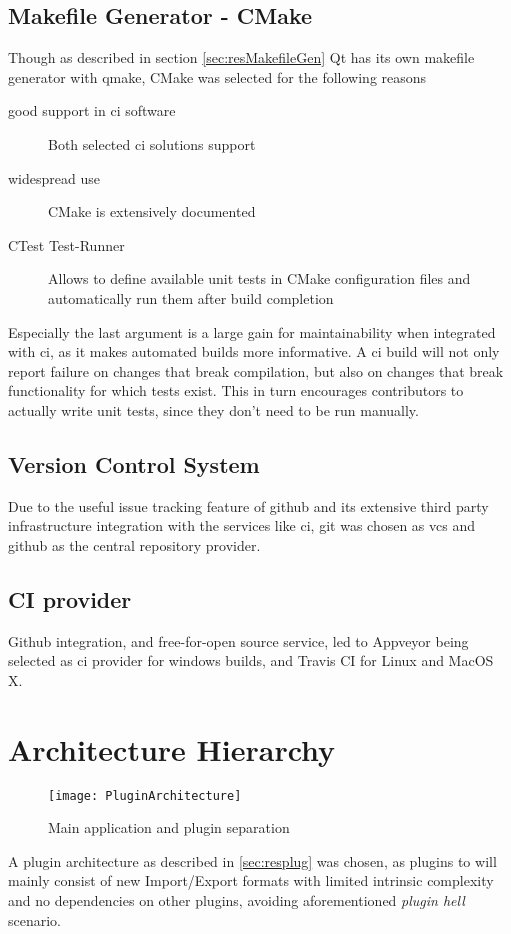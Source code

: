 \begin{figure}[h]
\end{figure}

\subsection{Makefile Generator - CMake}
Though as described in section \ref{sec:resMakefileGen} Qt has its own makefile generator with qmake, CMake was selected for the following reasons
\begin{description}
	\item[good support in \gls{ci} software] Both selected \gls{ci} solutions support 
	\item[widespread use] CMake is extensively documented 
	\item[CTest Test-Runner] Allows to define available unit tests in CMake configuration files and automatically run them after build completion 
\end{description}

Especially the last argument is a large gain for maintainability when integrated with \gls{ci}, as it makes automated builds more informative.
A \gls{ci} build will not only report failure on changes that break compilation, but also on changes that break functionality for which tests exist. This in turn encourages contributors to actually write unit tests, since they don't need to be run manually.


\subsection{Version Control System}
Due to the useful issue tracking feature of github and its extensive third party infrastructure integration with the services like \gls{ci}, git was chosen as \gls{vcs} and github as the central repository provider.

\subsection{CI provider}
Github integration, and free-for-open source service, led to Appveyor being selected as \gls{ci} provider for windows builds, and Travis CI for Linux and MacOS X.

\section{Architecture Hierarchy}
\begin{figure}
	\texttt{[image: PluginArchitecture]}
	\caption{Main application and plugin separation}
	\label{fig:comp}
\end{figure}
A plugin architecture as described in \ref{sec:resplug} was chosen, as plugins to  will mainly consist of new Import/Export formats with limited intrinsic complexity and no dependencies on other plugins, avoiding aforementioned \textit{plugin hell} scenario.

